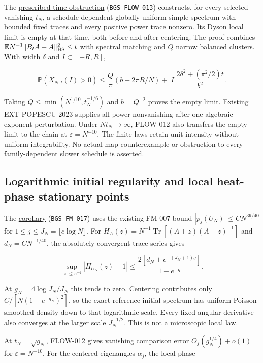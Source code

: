 The \href{https://github.com/ChurilovMaksim/BGS/blob/main/mathematics/dyson_relaxation_obstruction.md}{prescribed-time obstruction}
(\texttt{BGS-FLOW-013}) constructs, for every selected vanishing \(t_N\), a
schedule-dependent globally uniform simple spectrum with bounded fixed
traces and every positive power trace nonzero. Its Dyson local limit is
empty at that time, both before and after centering. The proof combines
\(\mathbb E N^{-1}\|B_tA-A\|_{\rm HS}^2\le t\) with spectral matching
and \(Q\) narrow balanced clusters. With width \(\delta\) and \(I\subset[-R,R]\),

\[
\mathbb P(X_{N,t}(I)>0)
\le\frac Q\pi(b+2\pi R/N)
+|I|\frac{2\delta^2+(\pi^2/2)t}{b^2}.
\]

Taking \(Q\le\min(N^{1/10},t_N^{-1/6})\) and \(b=Q^{-2}\) proves the
empty limit. Existing EXT-POPESCU-2023 supplies all-power nonvanishing
after one algebraic-exponent perturbation. Under \(Nt_N\to\infty\),
FLOW-012 also transfers the empty limit to the chain at \(\varepsilon=N^{-10}\).
The finite laws retain unit intensity without uniform integrability.
No actual-map counterexample or obstruction to every family-dependent
slower schedule is asserted.

\hypertarget{logarithmic-initial-regularity-and-local-heat-phase-stationary-points}{%
\subsection{Logarithmic initial regularity and local heat-phase stationary points}\label{logarithmic-initial-regularity-and-local-heat-phase-stationary-points}}

The \href{https://github.com/ChurilovMaksim/BGS/blob/main/mathematics/frozen_mesoscopic_regularity.md}{corollary} (\texttt{BGS-FM-017}) uses the
existing FM-007 bound \(|p_j(U_N)|\le CN^{39/40}\) for
\(1\le j\le J_N=\lfloor c\log N\rfloor\). For
\(H_A(z)=N^{-1}\operatorname{Tr}[(A+z)(A-z)^{-1}]\) and
\(d_N=CN^{-1/40}\), the absolutely convergent trace series gives

\[
\sup_{|z|\le e^{-g}}|H_{U_N}(z)-1|
\le\frac{2[d_N+e^{-(J_N+1)g}]}{1-e^{-g}}.
\]

At \(g_N=4\log J_N/J_N\) this tends to zero. Centering contributes only
\(C/[N(1-e^{-g_N})^2]\), so the exact reference initial spectrum has
uniform Poisson-smoothed density down to that logarithmic scale.
Every fixed angular derivative also converges at the larger scale
\(J_N^{-1/2}\). This is not a microscopic local law.

At \(t_N=\sqrt{g_N}\), FLOW-012 gives vanishing comparison error
\(O_f(g_N^{1/4})+o(1)\) for \(\varepsilon=N^{-10}\).
For the centered eigenangles \(\alpha_j\), the local phase

